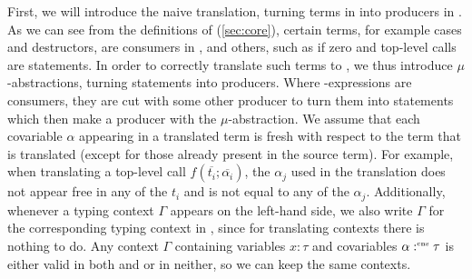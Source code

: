 First, we will introduce the naive translation, turning terms in \surfacelang{} into producers in \targetlang{}.
As we can see from the definitions of \targetlang{} (\cref{sec:core}), certain terms, for example cases and destructors, are consumers in \targetlang{}, and others, such as if zero and top-level calls are statements.
In order to correctly translate such terms to \targetlang{}, we thus introduce $\mu$-abstractions, turning statements into producers.
Where \targetlang{}-expressions are consumers, they are cut with some other producer to turn them into statements which then make a producer with the $\mu$-abstraction.
We assume that each covariable $\alpha$ appearing in a translated term is fresh with respect to the term that is translated (except for those already present in the source term).
For example, when translating a top-level call $f(\overline{t_i};\overline{\alpha_i})$, the $\alpha_j$ used in the translation does not appear free in any of the $t_i$ and is not equal to any of the $\alpha_j$.
Additionally, whenever a typing context $\Gamma$ appears on the left-hand side, we also write $\Gamma$ for the corresponding typing context in \targetlang{}, since for translating contexts there is nothing to do.
Any context $\Gamma$ containing variables $x:\tau$ and covariables $\alpha:^{\text{\tiny cns}}\tau$ is either valid in both \surfacelang{} and \targetlang{} or in neither, so we can keep the same contexts.

